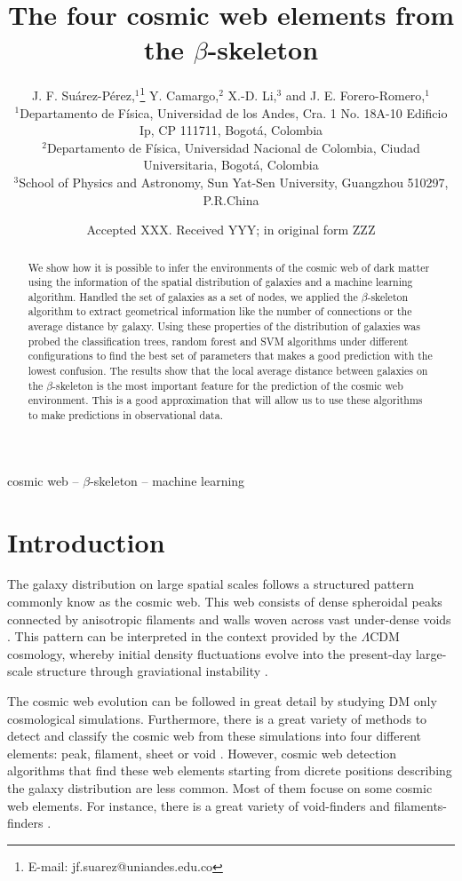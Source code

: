 \documentclass[usenatbib]{mnras}
\title[Cosmic web elements and the $\beta$-skeleton]{The four cosmic web elements from the $\beta$-skeleton}
\author[J. F. Su\'arez-P\'erez et al.]{
J. F. Su\'arez-P\'erez,$^{1}$\thanks{E-mail: jf.suarez@uniandes.edu.co}
Y. Camargo,$^{2}$ 
X.-D. Li,$^{3}$
and J. E. Forero-Romero,$^{1}$
\\
$^{1}$Departamento de F\'isica, Universidad de los Andes, Cra. 1 No. 18A-10 Edificio Ip, CP 111711, Bogot\'a, Colombia\\
$^{2}$Departamento de F\'isica, Universidad Nacional de Colombia, Ciudad Universitaria, Bogot\'a, Colombia\\
$^{3}$School of Physics and Astronomy, Sun Yat-Sen University, Guangzhou 510297, P.R.China\\
}
\date{Accepted XXX. Received YYY; in original form ZZZ}
\begin{document}
\label{firstpage}
\pagerange{\pageref{firstpage}--\pageref{lastpage}}
\maketitle

\begin{abstract}
We show how it is possible to infer the environments of the cosmic web
of dark matter using the information of the spatial distribution of
galaxies and a machine learning algorithm. 
Handled the set of galaxies as a set of nodes, we applied the
$\beta$-skeleton algorithm to extract geometrical information like the
number of connections or the average distance by galaxy. 
Using these properties of the distribution of galaxies was probed the
classification trees, random forest and SVM algorithms under different
configurations to find the best set of parameters that makes a good
prediction with the lowest confusion.  
The results show that the local average distance between galaxies on
the $\beta$-skeleton is the most important feature for the prediction
of the cosmic web environment. 
This is a good approximation that will allow us to use these
algorithms to make predictions in observational data.  
\end{abstract}

\begin{keywords}
cosmic web -- $\beta$-skeleton -- machine learning
\end{keywords}


\section{Introduction}
The galaxy distribution on large spatial scales follows a structured 
pattern commonly know as the cosmic web. 
This web consists of dense spheroidal peaks connected by
anisotropic filaments and walls woven across vast under-dense voids
\citep{Bond1996}. 
This pattern can be interpreted in the context provided by the
$\Lambda$CDM cosmology, whereby initial density fluctuations   evolve
into the present-day large-scale structure through graviational
instability \citep{ZelDovich1970,White1987}.  

The cosmic web evolution can be followed in great detail by studying
DM only cosmological simulations. 
Furthermore, there is a great variety of methods to detect and
classify the cosmic web from these simulations into four different
elements: peak, filament, sheet or void \citep{Libeskind2018}.  
However, cosmic web detection algorithms that find these web elements
starting from dicrete positions describing the galaxy distribution are
less common.
Most of them focuse on some cosmic web elements.
For instance, there is a great variety of void-finders
\citep{Platen2007,Neyrinck2008,Ravoux2020} and filaments-finders
\citep{Novikov2003,Zhang2009,Sousbie2010,Chen2015,Luber2019,Malavasi2020}.   
\end{document}
